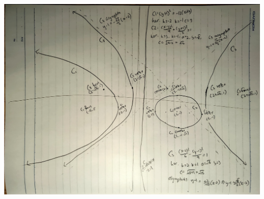 \documentclass{article}
\begin{document}
\begin{itemize}
	\centering
	\includegraphics*[width=\linewidth]{q2c.png}


\end{itemize}
\end{document}
